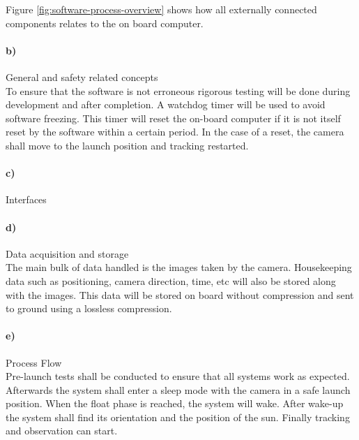 Figure \ref{fig:software-process-overview} shows how all externally connected components relates to the on board computer.

\paragraph{b)} General and safety related concepts\\

To ensure that the software is not erroneous rigorous testing will be done during development and after completion. A watchdog timer will be used to avoid software freezing. This timer will reset the on-board computer if it is not itself reset by the software within a certain period. In the case of a reset, the camera shall move to the launch position and tracking restarted.

\paragraph{c)} Interfaces\\



\paragraph{d)} Data acquisition and storage\\

The main bulk of data handled is the images taken by the camera. Housekeeping data such as positioning, camera direction, time, etc will also be stored along with the images. This data will be stored on board without compression and sent to ground using a lossless compression.



\paragraph{e)} Process Flow\\

Pre-launch tests shall be conducted to ensure that all systems work as expected. Afterwards the system shall enter a sleep mode with the camera in a safe launch position. When the float phase is reached, the system will wake. After wake-up the system shall find its orientation and the position of the sun. Finally tracking and observation can start.

